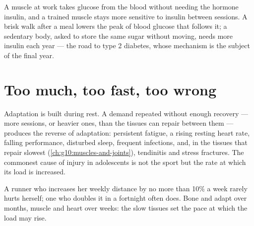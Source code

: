 \begin{example}\label{ex:g10:sport-and-health:sugar}
A muscle at work takes glucose from the blood without needing the
hormone insulin, and a trained muscle stays more sensitive to insulin
between sessions. A brisk walk after a meal lowers the peak of blood
glucose that follows it; a sedentary body, asked to store the same
sugar without moving, needs more insulin each year --- the road to type
2 diabetes, whose mechanism is the subject of the final year.
\end{example}

\section{Too much, too fast, too wrong}

\begin{proposition}\label{prop:g10:sport-and-health:overtraining}
Adaptation is built during rest. A demand repeated without enough
recovery --- more sessions, or heavier ones, than the tissues can
repair between them --- produces the reverse of adaptation:
persistent fatigue, a rising resting heart rate, falling performance,
disturbed sleep, frequent infections, and, in the tissues that repair
slowest (\cref{ch:g10:muscles-and-joints}), tendinitis and stress
fractures. The commonest cause of injury in adolescents is not the
sport but the rate at which its load is increased.
\end{proposition}
\admitted

\begin{example}\label{ex:g10:sport-and-health:tenpercent}
A runner who increases her weekly distance by no more than 10\% a
week rarely hurts herself; one who doubles it in a fortnight often
does. Bone and  adapt over months, muscle and heart over
weeks: the slow tissues set the pace at which the load may rise.
\end{example}

